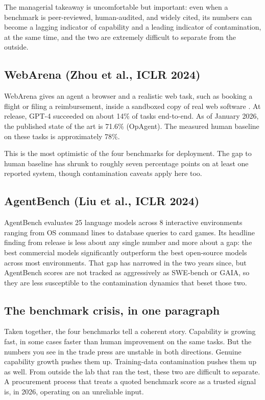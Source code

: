 \documentclass[11pt]{article}
\begin{document}
The managerial takeaway is uncomfortable but important: even when a
benchmark is peer-reviewed, human-audited, and widely cited, its
numbers can become a lagging indicator of capability and a leading
indicator of contamination, at the same time, and the two are
extremely difficult to separate from the outside.

\subsection*{WebArena (Zhou et al., ICLR 2024)}

WebArena gives an agent a browser and a realistic web task, such as
booking a flight or filing a reimbursement, inside a sandboxed copy
of real web software \citep{zhou2024webarena}. At release, GPT-4
succeeded on about 14\% of tasks end-to-end. As of January 2026, the
published state of the art is 71.6\% (OpAgent). The measured human
baseline on these tasks is approximately 78\%.

This is the most optimistic of the four benchmarks for deployment.
The gap to human baseline has shrunk to roughly seven percentage
points on at least one reported system, though contamination caveats
apply here too.

\subsection*{AgentBench (Liu et al., ICLR 2024)}

AgentBench \citep{liu2024agentbench} evaluates 25 language models
across 8 interactive environments ranging from OS command lines to
database queries to card games. Its headline finding from release is
less about any single number and more about a gap: the best
commercial models significantly outperform the best open-source
models across most environments. That gap has narrowed in the two
years since, but AgentBench scores are not tracked as aggressively as
SWE-bench or GAIA, so they are less susceptible to the contamination
dynamics that beset those two.

\subsection*{The benchmark crisis, in one paragraph}

Taken together, the four benchmarks tell a coherent story. Capability
is growing fast, in some cases faster than human improvement on the
same tasks. But the numbers you see in the trade press are unstable
in both directions. Genuine capability growth pushes them up.
Training-data contamination pushes them up as well. From outside the
lab that ran the test, these two are difficult to separate. A
procurement process that treats a quoted benchmark score as a trusted
signal is, in 2026, operating on an unreliable input.
\end{document}
